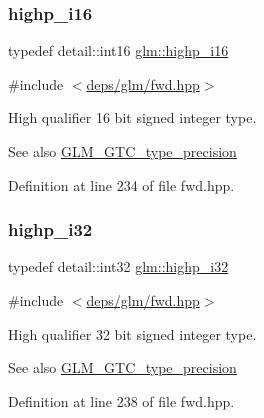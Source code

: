 \subsubsection{\texorpdfstring{highp\+\_\+i16}{highp\_i16}}
{\footnotesize\ttfamily typedef detail\+::int16 \hyperlink{group__gtc__type__precision_gaa04399853952dbce29cb62e2432f350a}{glm\+::highp\+\_\+i16}}



{\ttfamily \#include $<$\hyperlink{fwd_8hpp}{deps/glm/fwd.\+hpp}$>$}

High qualifier 16 bit signed integer type. \begin{DoxySeeAlso}{See also}
\hyperlink{group__gtc__type__precision}{G\+L\+M\+\_\+\+G\+T\+C\+\_\+type\+\_\+precision} 
\end{DoxySeeAlso}


Definition at line 234 of file fwd.\+hpp.

\mbox{\label{group__gtc__type__precision_ga197d19b585222da57d70238a5cfc2be8}} 
\subsubsection{\texorpdfstring{highp\+\_\+i32}{highp\_i32}}
{\footnotesize\ttfamily typedef detail\+::int32 \hyperlink{group__gtc__type__precision_ga197d19b585222da57d70238a5cfc2be8}{glm\+::highp\+\_\+i32}}



{\ttfamily \#include $<$\hyperlink{fwd_8hpp}{deps/glm/fwd.\+hpp}$>$}

High qualifier 32 bit signed integer type. \begin{DoxySeeAlso}{See also}
\hyperlink{group__gtc__type__precision}{G\+L\+M\+\_\+\+G\+T\+C\+\_\+type\+\_\+precision} 
\end{DoxySeeAlso}


Definition at line 238 of file fwd.\+hpp.

\mbox{\label{group__gtc__type__precision_gad3cb9a0ac0266ea2c51c6fac256345d1}} 
